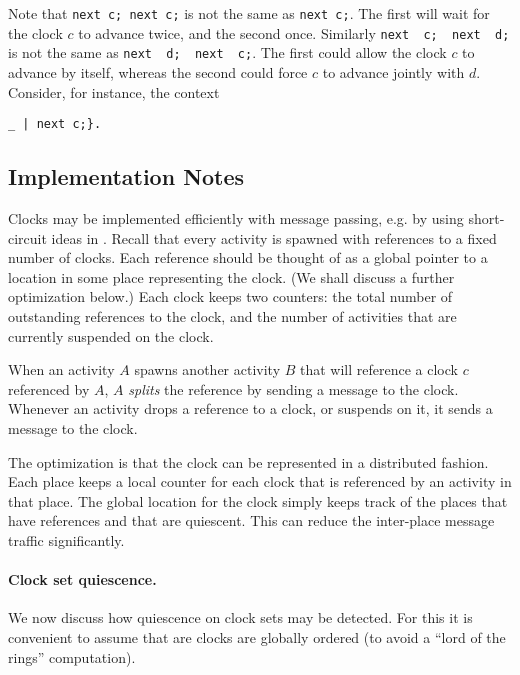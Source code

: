 \documentclass{article}
\begin{document}
Note that {\tt next c; next c;} is not the same as {\tt next c;}. The
first will wait for the clock $c$ to advance twice, and the second
once.  Similarly  {\tt next\, c;\, next\, d;} is not the same as
{\tt next\, d;\, next\, c;}. The first could allow the clock
$c$ to advance by itself, whereas the second could force $c$ to 
advance jointly with $d$. Consider, for instance, the context
{\tt \_ | next\,c;\}.

\subsection{Implementation Notes}
Clocks may be implemented efficiently with message passing, e.g.{} by
using short-circuit ideas in \cite{SaraswatPODC88}.  Recall that every
activity is spawned with references to a fixed number of clocks. Each
reference should be thought of as a global pointer to a location in
some place representing the clock. (We shall discuss a further
optimization below.) Each clock keeps two counters: the total number
of outstanding references to the clock, and the number of activities
that are currently suspended on the clock.

When an activity $A$ spawns another activity $B$ that will reference a
clock $c$ referenced by $A$, $A$ {\em splits} the reference by sending
a message to the clock. Whenever an activity drops a reference to a
clock, or suspends on it, it sends a message to the clock. 

The optimization is that the clock can be represented in a distributed
fashion. Each place keeps a local counter for each clock that is
referenced by an activity in that place. The global location for the
clock simply keeps track of the places that have references and that
are quiescent. This can reduce the inter-place message traffic
significantly.

\paragraph{Clock set quiescence.}
We now discuss how quiescence on clock sets may be detected. For this
it is convenient to assume that are clocks are globally ordered (to
avoid a ``lord of the rings'' computation).  

}
\end{document}
